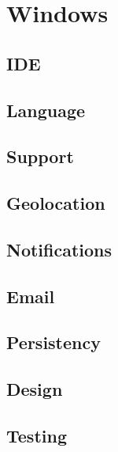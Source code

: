 \section{Windows}
\subsection{IDE}

\subsection{Language}

\subsection{Support}

\subsection{Geolocation}

\subsection{Notifications}

\subsection{Email}

\subsection{Persistency}

\subsection{Design}

\subsection{Testing}

